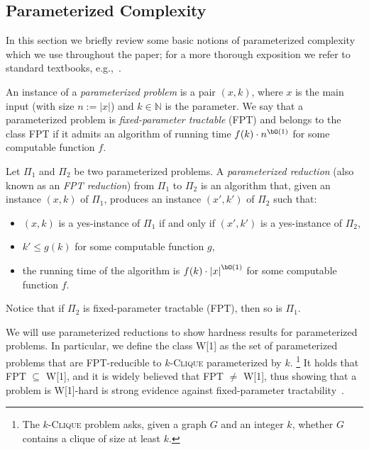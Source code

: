 \documentclass[11pt,letterpaper]{article}
\begin{document}
\begin{toappendix}
    
\section{Parameterized Complexity}\label{parameterized_complexity}

In this section we briefly review some basic notions of parameterized complexity
which we use throughout the paper;
for a more thorough exposition we refer to standard textbooks, e.g.,~\cite{books/CyganFKLMPPS15,books/DowneyF13}.


An instance of a \emph{parameterized problem} is a pair
$(x,k)$, where $x$ is the main input (with size $n := |x|$) and
$k \in \mathbb{N}$ is the parameter.
We say that a parameterized problem is \emph{fixed-parameter tractable} (FPT)
and belongs to the class FPT if it admits an algorithm of running time
$f(k) \cdot n^{\bO(1)}$ for some computable function $f$.

Let $\Pi_1$ and $\Pi_2$ be two parameterized problems.
A \emph{parameterized reduction} (also known as an \emph{FPT reduction}) from $\Pi_1$ to $\Pi_2$ is an algorithm that, given an instance $(x,k)$ of $\Pi_1$,
produces an instance $(x',k')$ of $\Pi_2$ such that:
\begin{itemize}
    \item $(x,k)$ is a yes-instance of $\Pi_1$ if and only if $(x',k')$ is a yes-instance of $\Pi_2$,
    \item $k' \leq g(k)$ for some computable function $g$,
    \item the running time of the algorithm is $f(k) \cdot {|x|}^{\bO(1)}$ for some computable function $f$.
\end{itemize}
Notice that if $\Pi_2$ is fixed-parameter tractable (FPT), then so is $\Pi_1$.

We will use parameterized reductions to show hardness results for parameterized problems.
In particular, we define the class W[1] as the set of parameterized problems that are
FPT-reducible to \textsc{$k$-Clique} parameterized by $k$.%
\footnote{The \textsc{$k$-Clique} problem asks,
given a graph $G$ and an integer $k$, whether $G$ contains a clique of size at least $k$.}
It holds that FPT $\subseteq$ W[1], and it is widely believed that FPT $\neq$ W[1],
thus showing that a problem is W[1]-hard is strong evidence against fixed-parameter tractability~\cite{books/CyganFKLMPPS15,books/DowneyF13}.


\end{toappendix}
\end{document}
